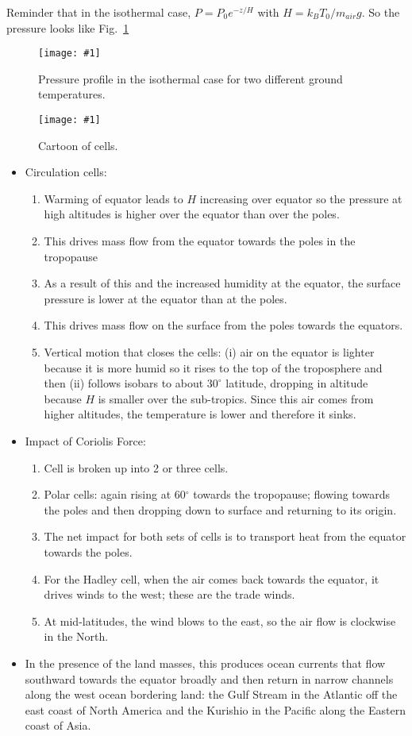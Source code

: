 \documentclass[11pt]{book}
\newcommand{\sfig}[2]{
\texttt{[image: \#1]}
        }
\newcommand{\Sfig}[2]{
   \begin{figure}[thbp]
   \begin{center}
    \sfig{../Figures/#1.pdf}{0.7\columnwidth}
    \caption{{\small #2}}
    \label{fig:#1}
     \end{center}
   \end{figure}
}
\newcommand{\Spng}[2]{
   \begin{figure}[thbp]
   \begin{center}
    \sfig{../Figures/#1.png}{0.7\columnwidth}
    \caption{{\small #2}}
    \label{fig:#1}
     \end{center}
   \end{figure}
}
\newcommand{\rf}[1]{\ref{fig:#1}}
\newcommand\bei{\begin{itemize}}
\newcommand\eei{\end{itemize}}
\newcommand\bee{\begin{enumerate}}
\newcommand\eee{\end{enumerate}}
\begin{document}
Reminder that in the isothermal case, $P=P_0e^{-z/H}$ with $H=k_BT_0/m_{air} g$. So the pressure looks like Fig.~\rf{isothermal}
\Sfig{isothermal}{Pressure profile in the isothermal case for two different ground temperatures.}

\Spng{AtmosphCirc2}{Cartoon of cells.}
\bei
\item Circulation cells:
\bee
\item Warming of equator leads to $H$ increasing over equator so the pressure at high altitudes is higher over the equator than over the poles.
\item This drives mass flow from the equator towards the poles in the tropopause
\item As a result of this and the increased humidity at the equator, the surface pressure is lower at the equator than at the poles.
\item This drives mass flow on the surface from the poles towards the equators.
\item Vertical motion that closes the cells: (i) air on the equator is lighter because it is more humid so it rises to the top of the troposphere and then (ii) follows isobars to about $30^\circ$ latitude, dropping in altitude because $H$ is smaller over the sub-tropics. Since this air comes from higher altitudes, the temperature is lower and therefore it sinks.
\eee
\item Impact of Coriolis Force:
\bee
\item Cell is broken up into 2 or three cells.
\item Polar cells: again rising at 60$^\circ$ towards the tropopause; flowing towards the poles and then dropping down to surface and returning to its origin.
\item The net impact for both sets of cells is to transport heat from the equator towards the poles.
\item For the Hadley cell, when the air comes back towards the equator, it drives winds to the west; these are the trade winds.
\item At mid-latitudes, the wind blows to the east, so the air flow is clockwise in the North.
\eee
\item In the presence of the land masses, this produces ocean currents that flow southward towards the equator broadly and then return in narrow channels along the west ocean bordering land: the Gulf Stream in the Atlantic off the east coast of North America and the Kurishio in the Pacific along the Eastern coast of Asia.
\eei
\end{document}
